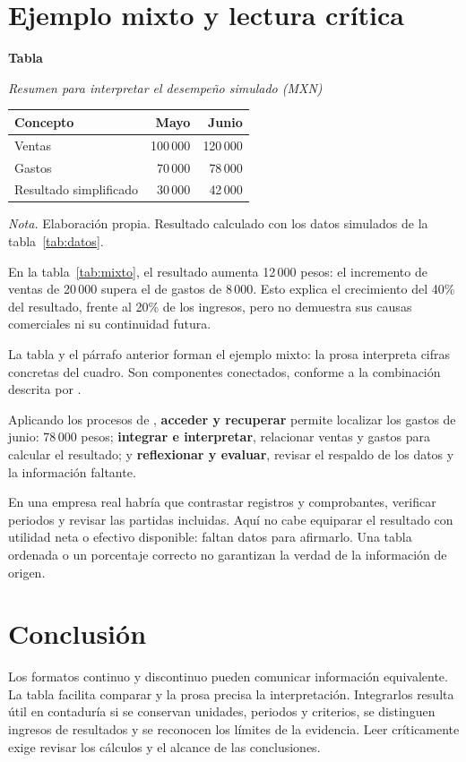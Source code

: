 \clearpage
\section{Ejemplo mixto y lectura crítica}

\label{tab:mixto}
\noindent\textbf{Tabla \thetable}\par
\noindent\textit{Resumen para interpretar el desempeño simulado (MXN)}\par
\nobreak
\noindent\begin{tabularx}{\textwidth}{@{}Yrr@{}}
\toprule
\textbf{Concepto} & \textbf{Mayo} & \textbf{Junio} \\
\midrule
Ventas & 100\,000 & 120\,000 \\
Gastos & 70\,000 & 78\,000 \\
Resultado simplificado & 30\,000 & 42\,000 \\
\bottomrule
\end{tabularx}
\par\noindent\textit{Nota.} Elaboración propia. Resultado calculado
con los datos simulados de la tabla~\ref{tab:datos}.

En la tabla~\ref{tab:mixto}, el resultado aumenta 12\,000 pesos:
el incremento de ventas de 20\,000 supera el de gastos de 8\,000.
Esto explica el crecimiento del 40\% del resultado, frente al 20\%
de los ingresos, pero no demuestra sus causas comerciales ni su
continuidad futura.

La tabla y el párrafo anterior forman el ejemplo mixto: la prosa
interpreta cifras concretas del cuadro. Son componentes conectados,
conforme a la combinación descrita por \textcite[p.~3]{gracida2012}.

Aplicando los procesos de \textcite[p.~4]{gracida2012},
\textbf{acceder y recuperar} permite localizar los gastos de junio:
78\,000 pesos; \textbf{integrar e interpretar}, relacionar ventas y
gastos para calcular el resultado; y \textbf{reflexionar y evaluar},
revisar el respaldo de los datos y la información faltante.

En una empresa real habría que contrastar registros y comprobantes,
verificar periodos y revisar las partidas incluidas. Aquí no cabe
equiparar el resultado con utilidad neta o efectivo disponible:
faltan datos para afirmarlo. Una tabla ordenada o un porcentaje
correcto no garantizan la verdad de la información de origen.

\section{Conclusión}

Los formatos continuo y discontinuo pueden comunicar información
equivalente. La tabla facilita comparar y la prosa precisa la
interpretación. Integrarlos resulta útil en contaduría si se conservan
unidades, periodos y criterios, se distinguen ingresos de resultados
y se reconocen los límites de la evidencia. Leer críticamente exige
revisar los cálculos y el alcance de las conclusiones.

